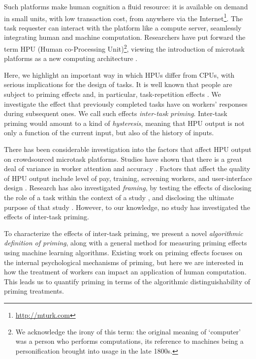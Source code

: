 \documentclass[letterpaper,twocolumn]{article}
\begin{document}
Such platforms make human cognition a fluid resource: it is available 
on demand in small units, with low transaction 
cost, from anywhere via the 
Internet\footnote{\href{http://mturk.com}{http://mturk.com}}.
The task requester can 
interact with the platform like a compute server, seamlessly 
integrating human and machine computation.  Researchers have put forward the 
term HPU (Human co-Processing Unit)\footnote{We acknowledge the irony of this 
term: the original meaning of `computer' was a person who performs 
computations, its reference to machines being a personification brought into 
usage in the late 1800s\cite{Dictionary:hl}.}, viewing the introduction of 
microtask platforms as a new computing architecture
\cite{5543192}.  

Here, we highlight an important way in which HPUs differ from CPUs, with 
serious implications for the design of tasks.  It is well known that people 
are subject to priming effects 
\cite{BJOP:BJOP1796, No2007, beller1971priming} and, in particular, task-repetition effects
\cite{Gass1999549, sohn2001task}.  
We investigate the effect that previously completed tasks have on workers'
responses during subsequent ones. We call such effects 
\textit{inter-task priming}.  Inter-task priming would amount to a kind of
\textit{hysteresis}, meaning that HPU output is not only a function of the 
current input, but also of the history of inputs.

There has been considerable investigation into the factors that affect HPU 
output on crowdsourced microtask platforms.  Studies have shown that 
there is a great deal of variance in worker attention and 
accuracy \cite{kazai2013analysis}.  Factors that affect the quality of HPU 
output include level of pay\cite{kazai2013analysis}, 
training\cite{le2010ensuring}, screening workers\cite{paolacci2010running}, 
and user-interface design
\cite{Finnerty2013}.  Research has also investigated \textit{framing}, 
by testing the effects of disclosing the role of a task within the 
context of a study \cite{Kinnaird2012281}, and disclosing the ultimate 
purpose of that study \cite{chandler2013breaking}.  However, to our knowledge, 
no study has investigated the effects of inter-task priming.

To characterize the effects of inter-task priming, we present a novel  
\textit{algorithmic definition of priming}, along with a general method 
for measuring priming effects using machine learning algorithms.  
Existing work on priming effects focuses on the internal psychological 
mechanisms of priming, but here we are interested in how the treatment of 
workers can impact an application of human computation. This leads us to 
quantify priming in terms of the algorithmic distinguishability of priming
treatments.
\end{document}
